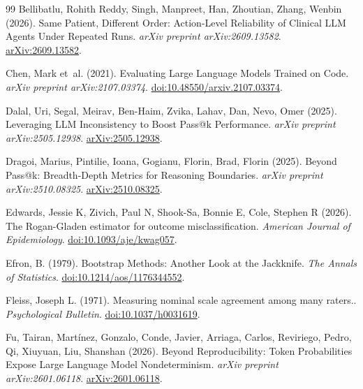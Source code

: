 \documentclass[11pt,letterpaper]{article}
\begin{document}
\begin{thebibliography}{99}
Bellibatlu, Rohith Reddy, Singh, Manpreet, Han, Zhoutian, Zhang, Wenbin (2026).
\newblock Same Patient, Different Order: Action-Level Reliability of Clinical LLM Agents Under Repeated Runs.
\newblock \emph{arXiv preprint arXiv:2609.13582}.
\newblock \href{https://arxiv.org/abs/2609.13582}{arXiv:2609.13582}.

Chen, Mark et~al. (2021).
\newblock Evaluating Large Language Models Trained on Code.
\newblock \emph{arXiv preprint arXiv:2107.03374}.
\newblock \href{https://doi.org/10.48550/arxiv.2107.03374}{doi:10.48550/arxiv.2107.03374}.

Dalal, Uri, Segal, Meirav, Ben-Haim, Zvika, Lahav, Dan, Nevo, Omer (2025).
\newblock Leveraging LLM Inconsistency to Boost Pass@k Performance.
\newblock \emph{arXiv preprint arXiv:2505.12938}.
\newblock \href{https://arxiv.org/abs/2505.12938}{arXiv:2505.12938}.

Dragoi, Marius, Pintilie, Ioana, Gogianu, Florin, Brad, Florin (2025).
\newblock Beyond Pass@k: Breadth-Depth Metrics for Reasoning Boundaries.
\newblock \emph{arXiv preprint arXiv:2510.08325}.
\newblock \href{https://arxiv.org/abs/2510.08325}{arXiv:2510.08325}.

Edwards, Jessie K, Zivich, Paul N, Shook-Sa, Bonnie E, Cole, Stephen R (2026).
\newblock The Rogan-Gladen estimator for outcome misclassification.
\newblock \emph{American Journal of Epidemiology}.
\newblock \href{https://doi.org/10.1093/aje/kwag057}{doi:10.1093/aje/kwag057}.

Efron, B. (1979).
\newblock Bootstrap Methods: Another Look at the Jackknife.
\newblock \emph{The Annals of Statistics}.
\newblock \href{https://doi.org/10.1214/aos/1176344552}{doi:10.1214/aos/1176344552}.

Fleiss, Joseph L. (1971).
\newblock Measuring nominal scale agreement among many raters..
\newblock \emph{Psychological Bulletin}.
\newblock \href{https://doi.org/10.1037/h0031619}{doi:10.1037/h0031619}.

Fu, Tairan, Martínez, Gonzalo, Conde, Javier, Arriaga, Carlos, Reviriego, Pedro, Qi, Xiuyuan, Liu, Shanshan (2026).
\newblock Beyond Reproducibility: Token Probabilities Expose Large Language Model Nondeterminism.
\newblock \emph{arXiv preprint arXiv:2601.06118}.
\newblock \href{https://arxiv.org/abs/2601.06118}{arXiv:2601.06118}.


\end{thebibliography}
\end{document}
